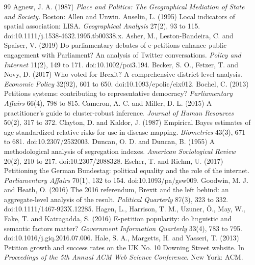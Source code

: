 \documentclass[11pt,a4paper]{article}
\begin{document}
\begin{thebibliography}{99}
 Agnew, J. A. (1987) \textit{Place and Politics: The Geographical Mediation of State and Society}. Boston: Allen and Unwin.
 Anselin, L. (1995) Local indicators of spatial association: LISA. \textit{Geographical Analysis} 27(2), 93 to 115. doi:10.1111/j.1538-4632.1995.tb00338.x.
 Asher, M., Leston-Bandeira, C. and Spaiser, V. (2019) Do parliamentary debates of e-petitions enhance public engagement with Parliament? An analysis of Twitter conversations. \textit{Policy and Internet} 11(2), 149 to 171. doi:10.1002/poi3.194.
 Becker, S. O., Fetzer, T. and Novy, D. (2017) Who voted for Brexit? A comprehensive district-level analysis. \textit{Economic Policy} 32(92), 601 to 650. doi:10.1093/epolic/eix012.
 Bochel, C. (2013) Petitions systems: contributing to representative democracy? \textit{Parliamentary Affairs} 66(4), 798 to 815.
 Cameron, A. C. and Miller, D. L. (2015) A practitioner's guide to cluster-robust inference. \textit{Journal of Human Resources} 50(2), 317 to 372.
 Clayton, D. and Kaldor, J. (1987) Empirical Bayes estimates of age-standardized relative risks for use in disease mapping. \textit{Biometrics} 43(3), 671 to 681. doi:10.2307/2532003.
 Duncan, O. D. and Duncan, B. (1955) A methodological analysis of segregation indexes. \textit{American Sociological Review} 20(2), 210 to 217. doi:10.2307/2088328.
 Escher, T. and Riehm, U. (2017) Petitioning the German Bundestag: political equality and the role of the internet. \textit{Parliamentary Affairs} 70(1), 132 to 154. doi:10.1093/pa/gsw009.
 Goodwin, M. J. and Heath, O. (2016) The 2016 referendum, Brexit and the left behind: an aggregate-level analysis of the result. \textit{Political Quarterly} 87(3), 323 to 332. doi:10.1111/1467-923X.12285.
 Hagen, L., Harrison, T. M., Uzuner, \"O., May, W., Fake, T. and Katragadda, S. (2016) E-petition popularity: do linguistic and semantic factors matter? \textit{Government Information Quarterly} 33(4), 783 to 795. doi:10.1016/j.giq.2016.07.006.
 Hale, S. A., Margetts, H. and Yasseri, T. (2013) Petition growth and success rates on the UK No. 10 Downing Street website. In \textit{Proceedings of the 5th Annual ACM Web Science Conference}. New York: ACM.

\end{thebibliography}
\end{document}
